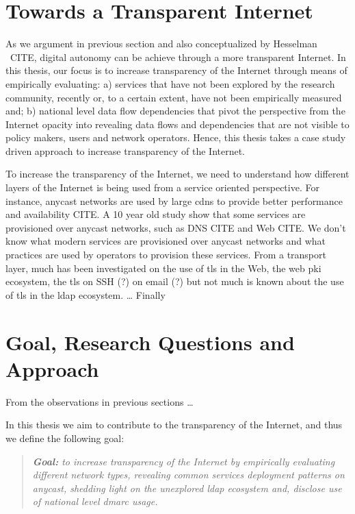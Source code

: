 \section{Towards a Transparent Internet}
\label{sec:intro-transparency}
As we argument in previous section and also conceptualized by Hesselman \etal~CITE, digital autonomy can be achieve through a more transparent Internet.
In this thesis, our focus is to increase transparency of the Internet through means of empirically evaluating: a) services that have not been explored by the research community, recently or, to a certain extent, have not been empirically measured and; b) national level data flow dependencies that pivot the perspective from the Internet opacity into revealing data flows and dependencies that are not visible to policy makers, users and network operators.
Hence, this thesis takes a case study driven approach to increase transparency of the Internet.

To increase the transparency of the Internet, we need to understand how different layers of the Internet is being used from a service oriented perspective.
For instance, anycast networks are used by large \glspl{cdn} to provide better performance and availability CITE.
A 10 year old study show that some services are provisioned over anycast networks, such as DNS CITE and Web CITE.
We don't know what modern services are provisioned over anycast networks and what practices are used by operators to provision these services.
From a transport layer, much has been investigated on the use of \gls{tls} in the Web, the web pki ecosystem, the tls on SSH (?) on email (?) but not much is known about the use of \gls{tls} in the \acrshort{ldap} ecosystem. \ldots
Finally

\section{Goal, Research Questions and Approach}
\label{sec:intro-goal-rq-approach}

From the observations in previous sections \ldots

In this thesis we aim to contribute to the transparency of the Internet, and thus we define the following goal:

\begin{quote}
    \itshape \textbf{Goal:} to increase transparency of the Internet by empirically evaluating different network types, revealing common services deployment patterns on anycast, shedding light on the unexplored \acrshort{ldap} ecosystem and, disclose use of national level \acrshort{dmarc} usage.
\end{quote}

